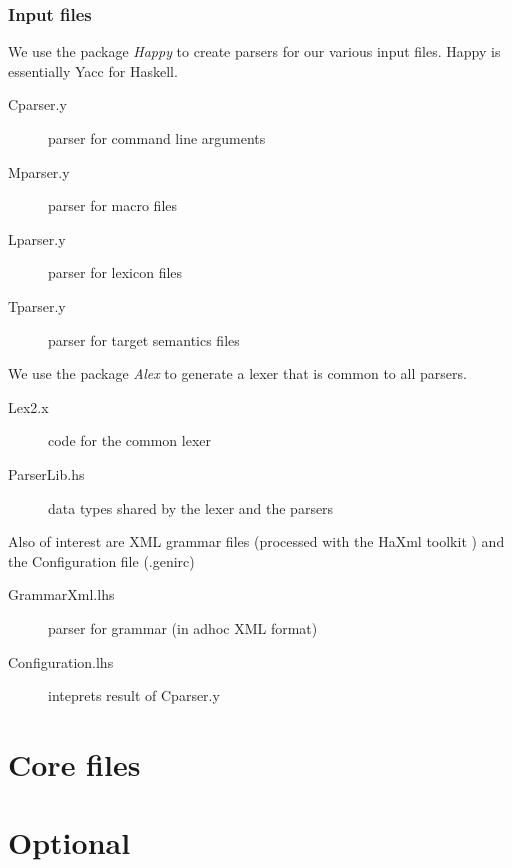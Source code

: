 \documentclass[a4paper,11pt]{report}
\begin{document}
\section{Input files}

We use the package \textit{Happy} to create parsers for our various
input files.  Happy is essentially Yacc for Haskell.

\begin{description}
 \item[Cparser.y] parser for command line arguments
 \item[Mparser.y] parser for macro files 
 \item[Lparser.y] parser for lexicon files 
 \item[Tparser.y] parser for target semantics files 
\end{description}

We use the package \textit{Alex} to generate a lexer that is common to
all parsers.

\begin{description}
 \item[Lex2.x] code for the common lexer
 \item[ParserLib.hs] data types shared by the lexer and the parsers 
\end{description}

Also of interest are XML grammar files (processed with the HaXml toolkit
) and the Configuration file (.genirc)

\begin{description}
 \item[GrammarXml.lhs] parser for grammar (in adhoc XML format)
 \item[Configuration.lhs] inteprets result of Cparser.y
\end{description}




\part{Core files}

       
       
       
       
       

\part{Optional}
\end{document}
